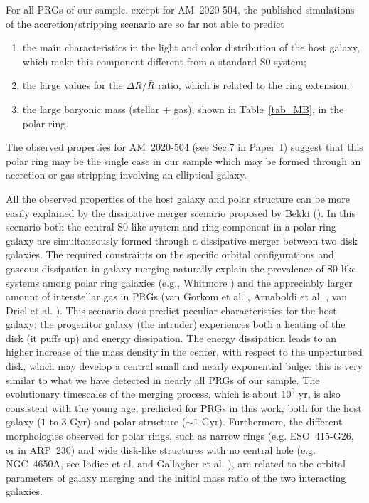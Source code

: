 \documentclass{aa}
\begin{document}
For all PRGs of our sample, except for AM~2020-504, 
the published simulations of the accretion/stripping scenario are 
so far not able to predict
\begin{enumerate}
\item the main characteristics in the light and color distribution of the  
host galaxy, which make this component different from a standard S0
system; 
\item the large values for the
$\Delta R / \bar R$ ratio, which is related to the ring extension;
\item the large baryonic mass (stellar + gas), shown in Table~\ref{tab_MB},
in the polar ring. 
\end{enumerate}

The observed properties for AM~2020-504 (see Sec.7 in Paper~I) suggest
that this polar ring may be the single case in our sample which may
be formed through an accretion or gas-stripping involving an elliptical
galaxy. 

All the observed properties of the host galaxy and polar structure can be
more easily explained by the dissipative merger scenario proposed by Bekki 
(\cite{Bekki98}).
In this scenario both the central S0-like system and ring component in a
polar ring galaxy are simultaneously formed through a dissipative merger
between two disk galaxies.  
The required constraints on the specific orbital configurations and gaseous 
dissipation in galaxy merging naturally explain the prevalence of S0-like 
systems among polar ring galaxies (e.g., Whitmore \cite{whitmore91}) and the 
appreciably  larger amount of interstellar gas in PRGs (van Gorkom et
al. \cite{vgorkom87}, 
Arnaboldi et al. \cite{magda97}, van Driel et al. \cite{vdriel2000}). 
This scenario does predict peculiar characteristics for the host galaxy:
the progenitor galaxy (the intruder) experiences both a heating of the disk
(it puffs up) and energy dissipation.
The energy dissipation leads to an higher increase of the mass density in the 
center, with respect to the unperturbed disk, which may develop a central  
small and nearly exponential bulge: this is very similar to what we have 
detected in nearly all PRGs of our sample. 
The evolutionary timescales of the merging process, which is about $10^9$
yr, is also consistent with the young age, predicted for PRGs in this
work, both for the host galaxy ($1$ to $3$ Gyr) and polar structure
($\sim 1$ Gyr). 
Furthermore,  the different morphologies observed for polar rings,
such as narrow rings (e.g. ESO~415-G26, or in ARP~230) and wide disk-like 
structures with no central hole (e.g. NGC~4650A, see Iodice et
al. \cite{4650aI} 
and Gallagher et al. \cite{4650aG}), are related to the orbital parameters of 
galaxy merging and the initial mass ratio of the two interacting galaxies.
\end{document}
